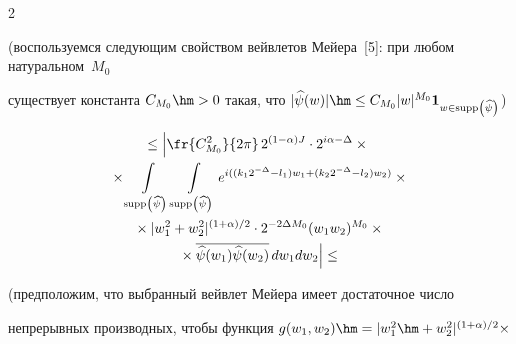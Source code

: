 \begin{multicols}{2}
\vspace*{-2pt}





\noindent


(воспользуемся следующим свойством вейвлетов Мейера~[5]: при любом натуральном~$M_0$


существует константа $C_{M_0}\hm>0$ такая, что  $|\widehat{\psi}(w)|\hm\leq


C_{M_0}|w|^{M_0}\textbf{1}_{w\in \mathrm{supp}\left(\widehat{\psi}\right)}$)





\noindent


\begin{multline*}


\leq\left\vert \fr{C^2_{M_0}}{2\pi}\,


2^{(1-\alpha)J}\cdot 2^{i\alpha-\Delta}\times{}\right.\\


{}\times \int\limits_{\mathrm{supp}\left(\widehat{\psi}\right)}


\int\limits_{\mathrm{supp}\left(\widehat{\psi}\right)}


e^{i((k_1 2^{-\Delta} - l_1) w_1+(k_2 2^{-\Delta} - l_2) w_2 )} \times{}\\


{}\times |w_1^2 +w_2^2|^{(1+\alpha)/{2}}\cdot


2^{-2\Delta M_0}(w_1 w_2)^{M_0} \times{}\\


\left.{}\times\overline{ \widehat{\psi}(w_1)


\widehat{\psi}(w_2)} \, d w_1 d w_2


\vphantom{\fr{C^2_{M_0}}{2\pi}}\right\vert\leq{}\\


\end{multline*}





\vspace*{-14pt}





\noindent


(предположим, что выбранный вейвлет Мейера имеет достаточное число


непрерывных производных, чтобы функция $g(w_1,w_2) \hm=


|w_1^2\hm +w_2^2|^{({1+\alpha})/2} \times$\linebreak



\end{multicols}
